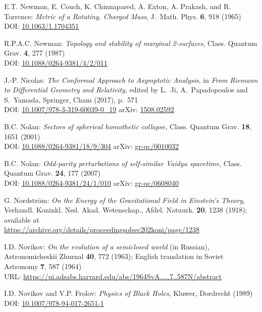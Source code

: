 \begin{thebibliography}{123}
E.T. Newman, E. Couch, K. Chinnapared, A. Exton, A. Prakash, and R. Torrence:
{\em Metric of a Rotating, Charged Mass},
J.~Math. Phys. {\bf 6}, 918 (1965)\\
DOI: \href{https://doi.org/10.1063/1.1704351}{10.1063/1.1704351}

R.P.A.C. Newman:
{\em Topology and stability of marginal 2-surfaces},
Class. Quantum Grav. {\bf 4}, 277 (1987)\\
DOI: \href{https://doi.org/10.1088/0264-9381/4/2/011}{10.1088/0264-9381/4/2/011}

J.-P. Nicolas:
{\em The Conformal Approach to Asymptotic Analysis},
in {\em From Riemann to Differential Geometry and Relativity},
edited by L.~Ji, A.~Papadopoulos and S.~Yamada, Springer, Cham (2017), p.~571\\
DOI: \href{https://doi.org/10.1007/978-3-319-60039-0_19}{10.1007/978-3-319-60039-0\_19}\hfill
arXiv: \href{https://arxiv.org/abs/1508.02592}{1508.02592}

B.C. Nolan:
{\em Sectors of spherical homothetic collapse},
Class. Quantum Grav. {\bf 18}, 1651 (2001)\\
DOI: \href{https://doi.org/10.1088/0264-9381/18/9/304}{10.1088/0264-9381/18/9/304}\hfill
arXiv: \href{https://arxiv.org/abs/gr-qc/0010032}{gr-qc/0010032}

B.C. Nolan:
{\em Odd-parity perturbations of self-similar Vaidya spacetime},
Class. Quantum Grav. {\bf 24}, 177 (2007)\\
DOI: \href{https://doi.org/10.1088/0264-9381/24/1/010}{10.1088/0264-9381/24/1/010}\hfill
arXiv: \href{https://arxiv.org/abs/gr-qc/0608040}{gr-qc/0608040}

G. Nordström:
{\em On the Energy of the Gravitational Field in Einstein's Theory},
Verhandl. Koninkl. Ned. Akad. Wetenschap., Afdel. Natuurk. {\bf 20}, 1238 (1918);
available at\\
\url{https://archive.org/details/proceedingsofsec202koni/page/1238}

I.D. Novikov:
{\em On the evolution of a semiclosed world} (in Russian),
Astronomicheskii Zhurnal {\bf 40}, 772 (1963); English translation in
Soviet Astronomy {\bf 7}, 587 (1964)\\
URL: \url{https://ui.adsabs.harvard.edu/abs/1964SvA.....7..587N/abstract}

I.D. Novikov and V.P. Frolov: {\em Physics of Black Holes},
Kluwer, Dordrecht (1989)\\
DOI: \href{https://doi.org/10.1007/978-94-017-2651-1}{10.1007/978-94-017-2651-1}


\end{thebibliography}
